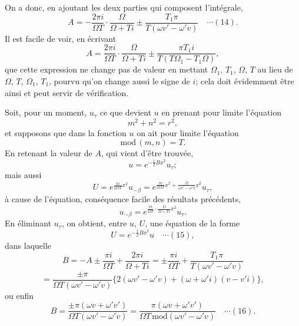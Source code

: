 \documentclass[12pt,a4paper]{article}
\begin{document}
On a donc, en ajoutant les deux parties qui composent l'int\'egrale,
\[
A = -\frac{2\pi i}{\Omega T}\cdot\frac{\Omega}{\Omega + Ti} \pm \frac{T_1\pi}{T(\omega v' - \omega' v)} \quad\cdots(14).
\]
Il est facile de voir, en \'ecrivant
\[
A = \frac{2\pi i}{\Omega T}\cdot\frac{\Omega}{\Omega + Ti} \pm \frac{\pi T_1 i}{T(T\Omega_1 - T_1\Omega)},
\]
que cette expression ne change pas de valeur en mettant $\Omega_1$, $T_1$, $\Omega$, $T$ au lieu de $\Omega$, $T$, $\Omega_1$, $T_1$, pourvu qu'on change aussi le signe de $i$; cela doit \'evidemment \^etre ainsi et peut servir de v\'erification.

Soit, pour un moment, $u_\tau$ ce que devient $u$ en prenant pour limite l'\'equation
\[
m^2 + n^2 = r^2,
\]
et supposons que dans la fonction $u$ on ait pour limite l'\'equation
\[
\mathrm{mod}\,(m,n) = T.
\]
En retenant la valeur de $A$, qui vient d'\^etre trouv\'ee,
\[
u = e^{-\frac12 Bx^2}u_\tau;
\]
mais aussi
\[
U = e^{\frac{\pi i}{2\Omega T}x^2}u_{-\beta} = e^{\frac{\pi i}{2\Omega T}x^2 + \frac{\Omega}{\omega v' - \omega' v}x^2}u_\tau,
\]
\`a cause de l'\'equation, cons\'equence facile des r\'esultats pr\'ec\'edents,
\[
u_{-\beta} = e^{\frac{\pi i}{\Omega T}\cdot\frac{\Omega}{\Omega + Ti}x^2}u_\tau.
\]
En \'eliminant $u_\tau$, on obtient, entre $u$, $U$, une \'equation de la forme
\[
U = e^{-\frac12 Bx^2}u \quad\cdots(15),
\]
dans laquelle
\[
B = -A \pm \frac{\pi i}{\Omega T} + \frac{2\pi i}{\Omega + Ti} = \pm\frac{\pi i}{\Omega T} + \frac{T_1\pi}{T(\omega v' - \omega' v)}
\]
\[
= \frac{\pm\pi}{\Omega T(\omega v' - \omega' v)}\{2(\omega v' - \omega' v) + (\omega + \omega' i)(v - v' i)\},
\]
ou enfin
\[
B = \frac{\pm\pi(\omega v + \omega' v')}{\Omega T(\omega v' - \omega' v)} = \frac{\pi(\omega v + \omega' v')}{\Omega T\,\mathrm{mod}(\omega v' - \omega' v)} \quad\cdots(16).
\]

\newpage
\setcounter{page}{165}
\end{document}
